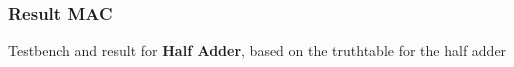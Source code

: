 \subsubsection{Result MAC}
Testbench and result for \textbf{Half Adder}, based on the truthtable for the half adder


